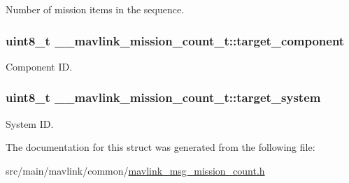 Number of mission items in the sequence. 

\hypertarget{struct____mavlink__mission__count__t_a21576207ae6595d5272a405fb8c198bf}{
\subsubsection[{target\+\_\+component}]{\setlength{\rightskip}{0pt plus 5cm}uint8\+\_\+t \+\_\+\+\_\+mavlink\+\_\+mission\+\_\+count\+\_\+t\+::target\+\_\+component}}\label{struct____mavlink__mission__count__t_a21576207ae6595d5272a405fb8c198bf}


Component I\+D. 

\hypertarget{struct____mavlink__mission__count__t_a9e211af96b9dd62f71c32fb3412dbfca}{
\subsubsection[{target\+\_\+system}]{\setlength{\rightskip}{0pt plus 5cm}uint8\+\_\+t \+\_\+\+\_\+mavlink\+\_\+mission\+\_\+count\+\_\+t\+::target\+\_\+system}}\label{struct____mavlink__mission__count__t_a9e211af96b9dd62f71c32fb3412dbfca}


System I\+D. 



The documentation for this struct was generated from the following file\+:\begin{DoxyCompactItemize}
\item 
src/main/mavlink/common/\hyperlink{mavlink__msg__mission__count_8h}{mavlink\+\_\+msg\+\_\+mission\+\_\+count.\+h}\end{DoxyCompactItemize}
